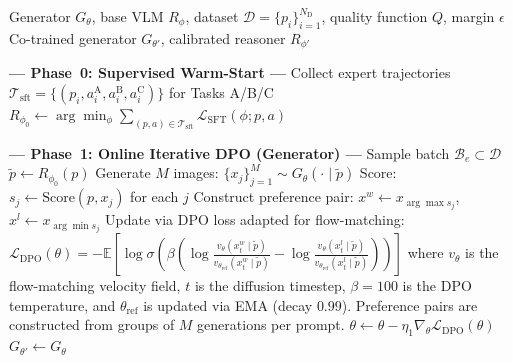 \documentclass{article}
\begin{document}
\begin{algorithm}[h]
\caption{Co-Training: Teach, Then Search}
\label{alg:cotrain}
\begin{algorithmic}[1]
\Require Generator $G_\theta$, base VLM $R_\phi$, dataset $\mathcal{D} = \{p_i\}_{i=1}^{N_{\mathrm{D}}}$, quality function $Q$, margin $\epsilon$
\Ensure Co-trained generator $G_{\theta'}$, calibrated reasoner $R_{\phi'}$

\Statex \textbf{--- Phase~0: Supervised Warm-Start ---}
\State Collect expert trajectories $\mathcal{T}_{\mathrm{sft}} = \{(p_i, a_i^{\mathrm{A}}, a_i^{\mathrm{B}}, a_i^{\mathrm{C}})\}$ for Tasks A/B/C 
\State $R_{\phi_0} \leftarrow \arg\min_\phi \sum_{(p,a) \in \mathcal{T}_{\mathrm{sft}}} \mathcal{L}_{\mathrm{SFT}}(\phi; p, a)$
\Statex

\Statex \textbf{--- Phase~1: Online Iterative DPO (Generator) ---}
    \State Sample batch $\mathcal{B}_e \subset \mathcal{D}$
        \State $\tilde{p} \leftarrow R_{\phi_0}(p)$ 
        \State Generate $M$ images: $\{x_j\}_{j=1}^{M} \sim G_{\theta}(\cdot \mid \tilde{p})$
        \State Score: $s_j \leftarrow \text{Score}(p, x_j)$ for each $j$ 
        \State Construct preference pair: $x^{w} \leftarrow x_{\arg\max s_j}$,\; $x^{l} \leftarrow x_{\arg\min s_j}$
    \EndFor
    \State Update via DPO loss adapted for flow-matching:
    \Statex \qquad $\mathcal{L}_{\mathrm{DPO}}(\theta) = -\mathbb{E}\!\left[\log\sigma\!\left(\beta \left(\log \frac{v_\theta(x^w_t \mid \tilde{p})}{v_{\theta_{\mathrm{ref}}}(x^w_t \mid \tilde{p})} - \log \frac{v_\theta(x^l_t \mid \tilde{p})}{v_{\theta_{\mathrm{ref}}}(x^l_t \mid \tilde{p})}\right)\right)\right]$
    \Statex \qquad where $v_\theta$ is the flow-matching velocity field, $t$ is the diffusion timestep, $\beta = 100$ is the DPO temperature, and $\theta_{\mathrm{ref}}$ is updated via EMA (decay $0.99$). Preference pairs are constructed from groups of $M$ generations per prompt.
    \State $\theta \leftarrow \theta - \eta_1 \nabla_\theta \mathcal{L}_{\mathrm{DPO}}(\theta)$
\EndFor
\State $G_{\theta'} \leftarrow G_\theta$ 
\Statex


\end{algorithmic}
\end{algorithm}
\end{document}
